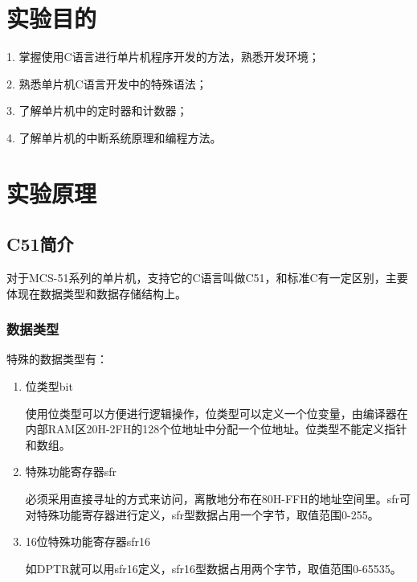 \begin{spacing}{1.3}  %
\maketitle
\tableofcontents
\thispagestyle{empty}
\restoregeometry
\newpage

\section{实验目的}

1. 掌握使用C语言进行单片机程序开发的方法，熟悉开发环境；

2. 熟悉单片机C语言开发中的特殊语法；

3. 了解单片机中的定时器和计数器；

4. 了解单片机的中断系统原理和编程方法。

\section{实验原理}

\subsection{C51简介}

对于MCS-51系列的单片机，支持它的C语言叫做C51，和标准C有一定区别，主要体现在数据类型和数据存储结构上。

\subsubsection{数据类型}

特殊的数据类型有：

\begin{enumerate}
\item 位类型bit

使用位类型可以方便进行逻辑操作，位类型可以定义一个位变量，由编译器在内部RAM区20H-2FH的128个位地址中分配一个位地址。位类型不能定义指针和数组。

\item 特殊功能寄存器sfr

必须采用直接寻址的方式来访问，离散地分布在80H-FFH的地址空间里。sfr可对特殊功能寄存器进行定义，sfr型数据占用一个字节，取值范围0-255。

\item 16位特殊功能寄存器sfr16

如DPTR就可以用sfr16定义，sfr16型数据占用两个字节，取值范围0-65535。


\end{enumerate}
\end{spacing}
